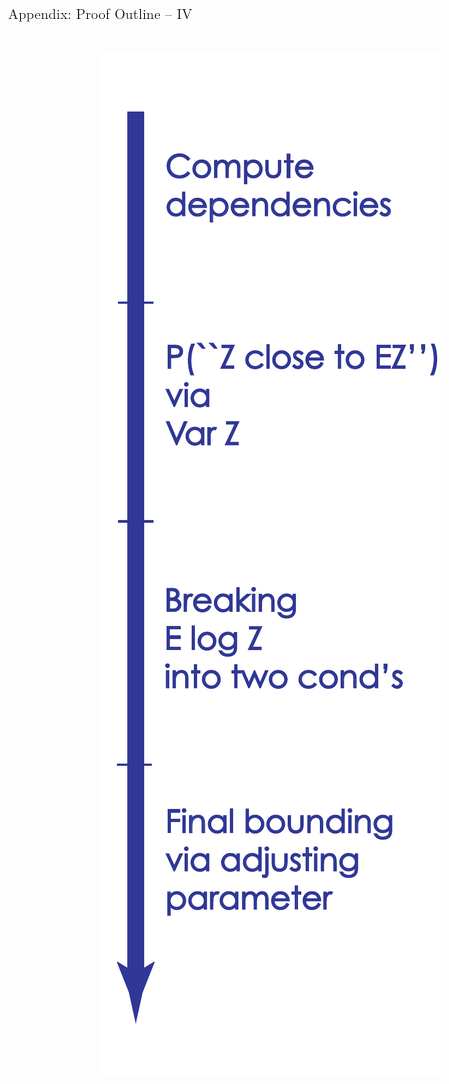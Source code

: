 \documentclass[presentation,12pt]{beamer}
\begin{document}
\begin{frame}{Appendix: Proof Outline -- IV}
\begin{columns}
\begin{column}{0.8\textwidth}
  \end{column}
  \hspace{5.5 pt}
  \begin{column}{0.2\textwidth}
  \hfill\includegraphics[scale=.23]{Proof-4.pdf}

  \end{column}
  \end{columns}
\end{frame}
\end{document}
